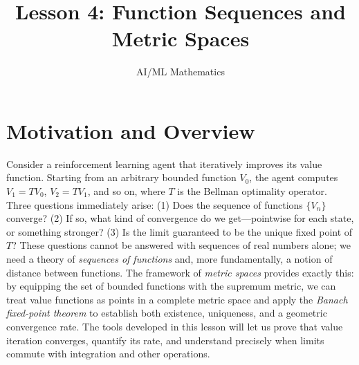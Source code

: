 \documentclass[11pt,a4paper]{article}
\title{Lesson 4: Function Sequences and Metric Spaces}
\author{AI/ML Mathematics}
\date{}
\begin{document}
\maketitle
\tableofcontents
\newpage

\section{Motivation and Overview}
\label{sec:motivation}

Consider a reinforcement learning agent that iteratively improves its
value function. Starting from an arbitrary bounded function $V_0$, the
agent computes $V_1 = TV_0$, $V_2 = TV_1$, and so on, where $T$ is the
Bellman optimality operator. Three questions immediately arise: (1) Does
the sequence of functions $\{V_n\}$ converge? (2) If so, what kind of
convergence do we get---pointwise for each state, or something stronger?
(3) Is the limit guaranteed to be the unique fixed point of $T$? These
questions cannot be answered with sequences of real numbers alone; we
need a theory of \emph{sequences of functions} and, more fundamentally,
a notion of distance between functions. The framework of \emph{metric
spaces} provides exactly this: by equipping the set of bounded functions
with the supremum metric, we can treat value functions as points in a
complete metric space and apply the \emph{Banach fixed-point theorem} to
establish both existence, uniqueness, and a geometric convergence rate.
The tools developed in this lesson will let us prove that value
iteration converges, quantify its rate, and understand precisely when
limits commute with integration and other operations.
\end{document}
